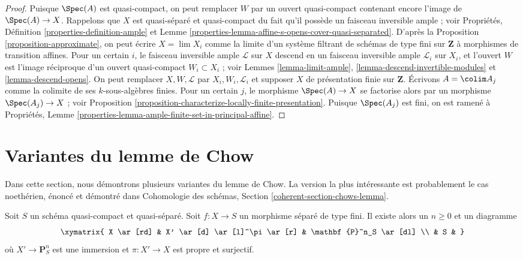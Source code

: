 \begin{proof}
Puisque $\Spec(A)$ est quasi-compact, on peut remplacer $W$ par un ouvert
quasi-compact contenant encore l'image de $\Spec(A) \to X$.
Rappelons que $X$ est quasi-séparé et quasi-compact du fait
qu'il possède un faisceau inversible ample ; voir
Propriétés, Définition \ref{properties-definition-ample} et
Lemme \ref{properties-lemma-affine-s-opens-cover-quasi-separated}.
D'après la Proposition \ref{proposition-approximate}, on peut
écrire $X = \lim X_i$ comme la limite d'un système filtrant
de schémas de type fini sur $\mathbf{Z}$
à morphismes de transition affines.
Pour un certain $i$, le faisceau inversible ample $\mathcal{L}$ sur $X$
descend en un faisceau inversible ample $\mathcal{L}_i$ sur $X_i$,
et l'ouvert $W$ est l'image réciproque d'un ouvert
quasi-compact $W_i \subset X_i$ ; voir
Lemmes \ref{lemma-limit-ample}, \ref{lemma-descend-invertible-modules} et
\ref{lemma-descend-opens}.
On peut remplacer $X, W, \mathcal{L}$ par $X_i, W_i, \mathcal{L}_i$
et supposer $X$ de présentation finie sur $\mathbf{Z}$.
Écrivons $A = \colim A_j$ comme la colimite de ses $k$-sous-algèbres finies.
Pour un certain $j$, le morphisme $\Spec(A) \to X$ se factorise alors par
un morphisme $\Spec(A_j) \to X$ ; voir
Proposition \ref{proposition-characterize-locally-finite-presentation}.
Puisque $\Spec(A_j)$ est fini, on est ramené à
Propriétés, Lemme \ref{properties-lemma-ample-finite-set-in-principal-affine}.
\end{proof}



















\section{Variantes du lemme de Chow}
\label{section-chows-lemma}

\noindent
Dans cette section, nous démontrons plusieurs variantes du lemme de Chow.
La version la plus intéressante est probablement le cas noethérien,
énoncé et démontré dans
Cohomologie des schémas, Section \ref{coherent-section-chows-lemma}.

\begin{lemma}
\label{lemma-chow-finite-type}
Soit $S$ un schéma quasi-compact et quasi-séparé.
Soit $f : X \to S$ un morphisme séparé de type fini.
Il existe alors un $n \geq 0$ et un diagramme
$$
\xymatrix{
X \ar[rd] & X' \ar[d] \ar[l]^\pi \ar[r] & \mathbf{P}^n_S \ar[dl] \\
& S &
}
$$
où $X' \to \mathbf{P}^n_S$ est une immersion et
$\pi : X' \to X$ est propre et surjectif.
\end{lemma}

